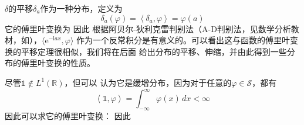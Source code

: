 \begin{example}
    $\delta$的平移$\delta_a$作为一种分布，定义为
\begin{equation}
    \delta_a(\varphi)=\left\langle \delta_a,\varphi\right\rangle=\varphi(a)
\end{equation}
它的傅里叶变换为
因此
根据阿贝尔-狄利克雷判别法（A-D判别法，见数学分析教材，如\cite{xinjiang}），$\langle \mathrm{e}^{-\mathrm{i} a x},\varphi\rangle$
作为一个反常积分是有意义的。可以看出这与函数的傅里叶变换的平移定理很相似，我们将在后面
给出分布的平移、伸缩，并由此得到一些分布的傅里叶变换的性质。
\end{example}

\begin{example}
尽管$\mathds{1}\notin L^1(\mathbb{R})$，但可以
认为它是缓增分布，因为对于任意的$\varphi\in\mathcal{S} $，都有
\[\left\langle \mathds{1},\varphi\right\rangle=\int_{-\infty}^{\infty}\varphi(x)\,dx<\infty\]
因此可以求它的傅里叶变换：
因此
\end{example}


